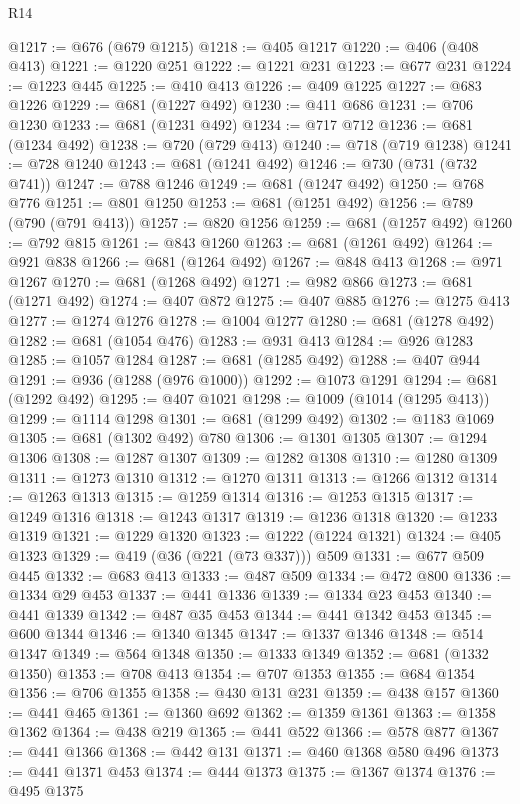 \begin{lexlean}{R14}
\begin{coremodule}
@1217 := @676 (@679 @1215)
@1218 := @405 @1217
@1220 := @406 (@408 @413)
@1221 := @1220 @251
@1222 := @1221 @231
@1223 := @677 @231
@1224 := @1223 @445
@1225 := @410 @413
@1226 := @409 @1225
@1227 := @683 @1226
@1229 := @681 (@1227 @492)
@1230 := @411 @686
@1231 := @706 @1230
@1233 := @681 (@1231 @492)
@1234 := @717 @712
@1236 := @681 (@1234 @492)
@1238 := @720 (@729 @413)
@1240 := @718 (@719 @1238)
@1241 := @728 @1240
@1243 := @681 (@1241 @492)
@1246 := @730 (@731 (@732 @741))
@1247 := @788 @1246
@1249 := @681 (@1247 @492)
@1250 := @768 @776
@1251 := @801 @1250
@1253 := @681 (@1251 @492)
@1256 := @789 (@790 (@791 @413))
@1257 := @820 @1256
@1259 := @681 (@1257 @492)
@1260 := @792 @815
@1261 := @843 @1260
@1263 := @681 (@1261 @492)
@1264 := @921 @838
@1266 := @681 (@1264 @492)
@1267 := @848 @413
@1268 := @971 @1267
@1270 := @681 (@1268 @492)
@1271 := @982 @866
@1273 := @681 (@1271 @492)
@1274 := @407 @872
@1275 := @407 @885
@1276 := @1275 @413
@1277 := @1274 @1276
@1278 := @1004 @1277
@1280 := @681 (@1278 @492)
@1282 := @681 (@1054 @476)
@1283 := @931 @413
@1284 := @926 @1283
@1285 := @1057 @1284
@1287 := @681 (@1285 @492)
@1288 := @407 @944
@1291 := @936 (@1288 (@976 @1000))
@1292 := @1073 @1291
@1294 := @681 (@1292 @492)
@1295 := @407 @1021
@1298 := @1009 (@1014 (@1295 @413))
@1299 := @1114 @1298
@1301 := @681 (@1299 @492)
@1302 := @1183 @1069
@1305 := @681 (@1302 @492) @780
@1306 := @1301 @1305
@1307 := @1294 @1306
@1308 := @1287 @1307
@1309 := @1282 @1308
@1310 := @1280 @1309
@1311 := @1273 @1310
@1312 := @1270 @1311
@1313 := @1266 @1312
@1314 := @1263 @1313
@1315 := @1259 @1314
@1316 := @1253 @1315
@1317 := @1249 @1316
@1318 := @1243 @1317
@1319 := @1236 @1318
@1320 := @1233 @1319
@1321 := @1229 @1320
@1323 := @1222 (@1224 @1321)
@1324 := @405 @1323
@1329 := @419 (@36 (@221 (@73 @337))) @509
@1331 := @677 @509 @445
@1332 := @683 @413
@1333 := @487 @509
@1334 := @472 @800
@1336 := @1334 @29 @453
@1337 := @441 @1336
@1339 := @1334 @23 @453
@1340 := @441 @1339
@1342 := @487 @35 @453
@1344 := @441 @1342 @453
@1345 := @600 @1344
@1346 := @1340 @1345
@1347 := @1337 @1346
@1348 := @514 @1347
@1349 := @564 @1348
@1350 := @1333 @1349
@1352 := @681 (@1332 @1350)
@1353 := @708 @413
@1354 := @707 @1353
@1355 := @684 @1354
@1356 := @706 @1355
@1358 := @430 @131 @231
@1359 := @438 @157
@1360 := @441 @465
@1361 := @1360 @692
@1362 := @1359 @1361
@1363 := @1358 @1362
@1364 := @438 @219
@1365 := @441 @522
@1366 := @578 @877
@1367 := @441 @1366
@1368 := @442 @131
@1371 := @460 @1368 @580 @496
@1373 := @441 @1371 @453
@1374 := @444 @1373
@1375 := @1367 @1374
@1376 := @495 @1375

\end{coremodule}
\end{lexlean}
